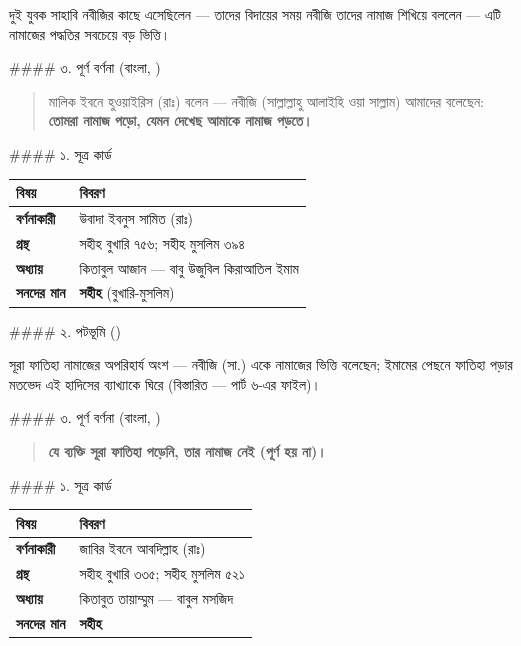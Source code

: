 দুই যুবক সাহাবি নবীজির কাছে এসেছিলেন — তাদের বিদায়ের সময় নবীজি তাদের নামাজ শিখিয়ে বললেন — এটি নামাজের পদ্ধতির সবচেয়ে বড় ভিত্তি।

\#\#\#\# ৩. পূর্ণ বর্ণনা (বাংলা, )

\begin{quote}
মালিক ইবনে হুওয়াইরিস (রাঃ) বলেন — নবীজি (সাল্লাল্লাহু আলাইহি ওয়া সাল্লাম) আমাদের বলেছেন: \\
\textbf{তোমরা নামাজ পড়ো, যেমন দেখেছ আমাকে নামাজ পড়তে।}
\end{quote}

\#\#\#\# ১. সূত্র কার্ড

\begin{table}[h]\centering\small
\begin{tabular}{ll}
বিষয় & বিবরণ \\
\hline
\textbf{বর্ণনাকারী} & উবাদা ইবনুস সামিত (রাঃ) \\
\textbf{গ্রন্থ} & সহীহ বুখারি ৭৫৬; সহীহ মুসলিম ৩৯৪ \\
\textbf{অধ্যায়} & কিতাবুল আজান — বাবু উজুবিল কিরাআতিল ইমাম \\
\textbf{সনদের মান} & \textbf{সহীহ} (বুখারি-মুসলিম) \\
\hline
\end{tabular}
\end{table}

\#\#\#\# ২. পটভূমি ()

সূরা ফাতিহা নামাজের অপরিহার্য অংশ — নবীজি (সা.) একে নামাজের ভিত্তি বলেছেন; ইমামের পেছনে ফাতিহা পড়ার মতভেদ এই হাদিসের ব্যাখ্যাকে ঘিরে (বিস্তারিত — পার্ট ৬-এর ফাইল)।

\#\#\#\# ৩. পূর্ণ বর্ণনা (বাংলা, )

\begin{quote}
\textbf{যে ব্যক্তি সূরা ফাতিহা পড়েনি, তার নামাজ নেই (পূর্ণ হয় না)।}
\end{quote}

\#\#\#\# ১. সূত্র কার্ড

\begin{table}[h]\centering\small
\begin{tabular}{ll}
বিষয় & বিবরণ \\
\hline
\textbf{বর্ণনাকারী} & জাবির ইবনে আবদিল্লাহ (রাঃ) \\
\textbf{গ্রন্থ} & সহীহ বুখারি ৩৩৫; সহীহ মুসলিম ৫২১ \\
\textbf{অধ্যায়} & কিতাবুত তায়াম্মুম — বাবুল মসজিদ \\
\textbf{সনদের মান} & \textbf{সহীহ} \\
\hline
\end{tabular}
\end{table}

